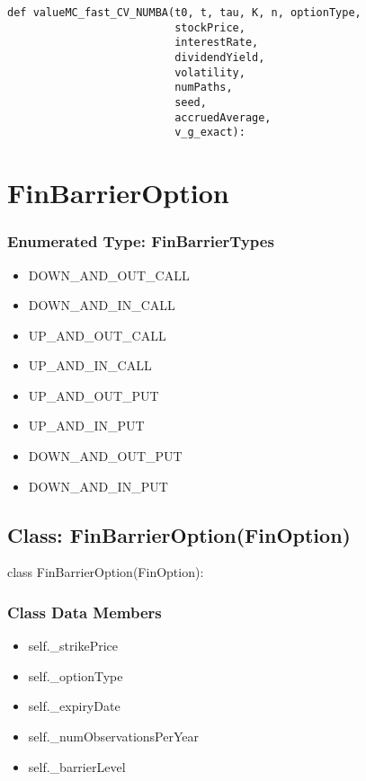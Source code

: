 \documentclass[twoside,11pt]{book}
\begin{document}
\begin{lstlisting}
def valueMC_fast_CV_NUMBA(t0, t, tau, K, n, optionType,
                          stockPrice,
                          interestRate,
                          dividendYield,
                          volatility,
                          numPaths,
                          seed,
                          accruedAverage,
                          v_g_exact):
\end{lstlisting}

\newpage
\section{FinBarrierOption}

\subsubsection{Enumerated Type: FinBarrierTypes}
\begin{itemize}
\item{DOWN\_AND\_OUT\_CALL}
\item{DOWN\_AND\_IN\_CALL}
\item{UP\_AND\_OUT\_CALL}
\item{UP\_AND\_IN\_CALL}
\item{UP\_AND\_OUT\_PUT}
\item{UP\_AND\_IN\_PUT}
\item{DOWN\_AND\_OUT\_PUT}
\item{DOWN\_AND\_IN\_PUT}
\end{itemize}

\subsection{Class: FinBarrierOption(FinOption)}
class FinBarrierOption(FinOption):

\subsubsection{Class Data Members}
\begin{itemize}
\item{self.\_strikePrice}
\item{self.\_optionType}
\item{self.\_expiryDate}
\item{self.\_numObservationsPerYear}
\item{self.\_barrierLevel}
\end{itemize}
\end{document}
